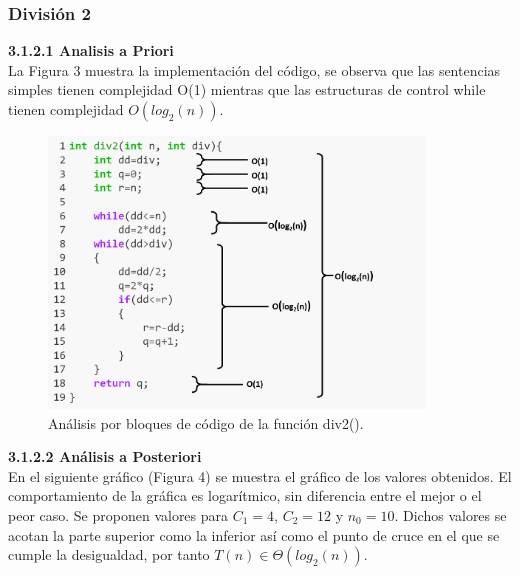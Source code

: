 \documentclass[12pt,twoside]{article}
\begin{document}
                
                
            \subsubsection{\large Divisi\'on 2}
                {\bf 3.1.2.1 Analisis a Priori}
                \\[0.3cm]
                La Figura 3 muestra la implementación del código, se observa que las sentencias simples tienen complejidad O(1) mientras que las estructuras de control while tienen complejidad $O(log_2(n))$.
                
                
                
                
                \begin{figure}[H]
                    \centering
                    \includegraphics[width=10cm]{imagenes/divc2.png}
                    \caption{Análisis por bloques de código de la función div2().}
                \end{figure}
                
                
                {\bf 3.1.2.2 Análisis a Posteriori}
                \\[0.3cm]
                En el siguiente gr\'afico (Figura 4) se muestra el gráfico de los valores obtenidos. El comportamiento de la gráfica es logarítmico, sin diferencia entre el mejor o  el peor caso.
                Se proponen valores para $C_{1}=4$, $C_{2}=12$ y $n_{0}=10$. Dichos valores se acotan la parte superior como la inferior as\'i como el punto de cruce en el que se cumple la desigualdad, por tanto $T(n)\in \Theta (log_{2}(n))$.
\end{document}
